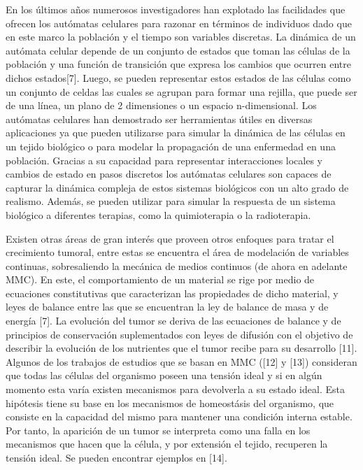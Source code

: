 \hspace{.1cm}En los últimos años numerosos investigadores han explotado las facilidades que ofrecen los autómatas celulares para razonar en términos de individuos dado que en este marco la población y el tiempo son variables discretas. La dinámica de un autómata celular depende de un conjunto de estados que toman las células de la población y una función de transición que expresa los cambios que ocurren entre dichos estados[7]. Luego, se pueden representar estos estados de las células como un conjunto de celdas las cuales se agrupan para formar una rejilla, que puede ser de una línea, un plano de 2 dimensiones o un espacio n-dimensional. Los autómatas celulares han demostrado ser herramientas útiles en diversas aplicaciones ya que pueden utilizarse para simular la dinámica de las células en un tejido biológico o para modelar la propagación de una enfermedad en una población. Gracias a su capacidad para representar interacciones locales y cambios de estado en pasos discretos los autómatas celulares son capaces de capturar la dinámica compleja de estos sistemas biológicos con un alto grado de realismo. Además, se pueden utilizar para simular la respuesta de un sistema biológico a diferentes terapias, como la quimioterapia o la radioterapia.

\hspace{.1cm}Existen otras áreas de gran interés que proveen otros enfoques para tratar el crecimiento tumoral, entre estas se encuentra el \'area de modelaci\'on de variables continuas, sobresaliendo la mecánica de medios continuos (de ahora en adelante MMC). En este, el comportamiento de un material se rige por medio de ecuaciones constitutivas que caracterizan las propiedades de dicho material, y leyes de balance entre las que se encuentran la ley de balance de masa y de energía [7]. La evolución del tumor se deriva de las ecuaciones de balance y de principios de conservación suplementados con leyes de difusión con el objetivo de describir la evolución de los nutrientes que el tumor recibe para su desarrollo [11]. Algunos de los trabajos de estudios que se basan en MMC ([12] y [13]) consideran que todas las células del organismo poseen una tensión ideal y si en algún momento esta varía existen mecanismos para devolverla a su estado ideal. Esta hipótesis tiene su base en los mecanismos de homeost\'asis del organismo, que consiste en la capacidad del mismo para mantener una condición interna estable. Por tanto, la aparición de un tumor se interpreta como una falla en los mecanismos que hacen que la célula, y por extensión el tejido, recuperen la tensión ideal. Se pueden encontrar ejemplos en [14].


